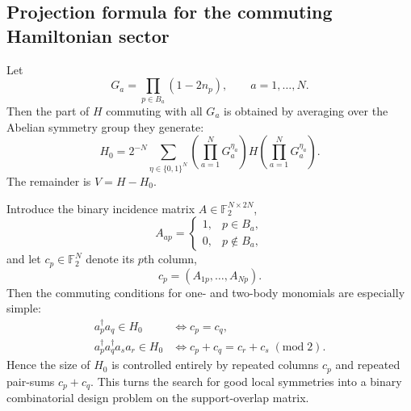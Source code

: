 \documentclass[11pt]{article}
\newcommand{\F}{\mathbb{F}_2}
\newcommand{\modtwo}{\; (\mathrm{mod}\; 2)}
\theoremstyle{definition}
\theoremstyle{remark}
\begin{document}
\subsection{Projection formula for the commuting Hamiltonian sector}
Let
\begin{equation}
  G_a=\prod_{p\in B_a}(1-2n_p),
  \qquad a=1,\dots,N.
\end{equation}
Then the part of $H$ commuting with all $G_a$ is obtained by averaging over the Abelian symmetry group they generate:
\begin{equation}
  H_0
  =
  2^{-N}
  \sum_{\eta\in\{0,1\}^N}
  \left(\prod_{a=1}^N G_a^{\eta_a}\right)
  H
  \left(\prod_{a=1}^N G_a^{\eta_a}\right).
\end{equation}
The remainder is $V=H-H_0$.

Introduce the binary incidence matrix $A\in \F^{N\times 2N}$,
\begin{equation}
  A_{ap}
  =
  \begin{cases}
    1,& p\in B_a,\\[2pt]
    0,& p\notin B_a,
  \end{cases}
\end{equation}
and let $c_p\in\F^N$ denote its $p$th column,
\begin{equation}
  c_p=(A_{1p},\dots,A_{Np}).
\end{equation}
Then the commuting conditions for one- and two-body monomials are especially simple:
\begin{align}
  a_p^\dagger a_q \in H_0
  &\iff c_p=c_q,
  \\
  a_p^\dagger a_q^\dagger a_s a_r \in H_0
  &\iff c_p+c_q=c_r+c_s \modtwo.
\end{align}
Hence the size of $H_0$ is controlled entirely by repeated columns $c_p$ and repeated pair-sums $c_p+c_q$. This turns the search for good local symmetries into a binary combinatorial design problem on the support-overlap matrix.
\end{document}
